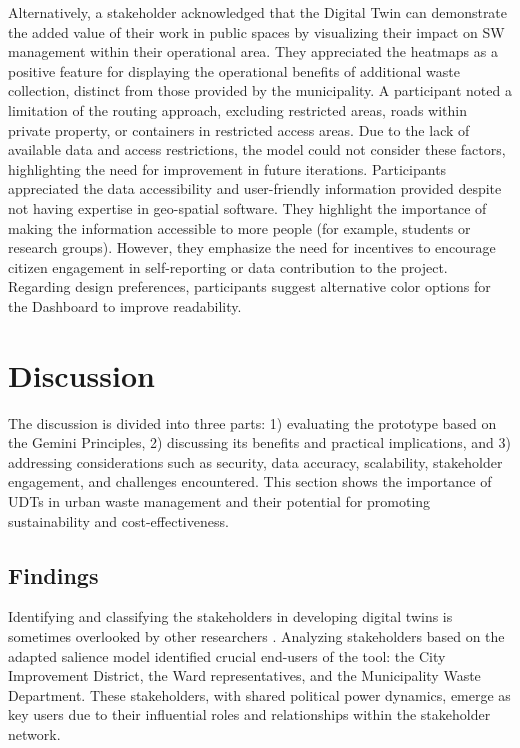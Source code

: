 \documentclass[authoryear,preprint,review,11pt,doubleblind]{elsarticle}
\begin{document}
    Alternatively, a stakeholder acknowledged that the Digital Twin can demonstrate the added value of their work in public spaces by visualizing their impact on SW management within their operational area. They appreciated the heatmaps as a positive feature for displaying the operational benefits of additional waste collection, distinct from those provided by the municipality. A participant noted a limitation of the routing approach, excluding restricted areas, roads within private property, or containers in restricted access areas. Due to the lack of available data and access restrictions, the model could not consider these factors, highlighting the need for improvement in future iterations. Participants appreciated the data accessibility and user-friendly information provided despite not having expertise in geo-spatial software. They highlight the importance of making the information accessible to more people (for example, students or research groups). However, they emphasize the need for incentives to encourage citizen engagement in self-reporting or data contribution to the project. Regarding design preferences, participants suggest alternative color options for the Dashboard to improve readability.

    \section{Discussion} \label{sec:Discussion}

    The discussion is divided into three parts: 1) evaluating the prototype based on the Gemini Principles, 2) discussing its benefits and practical implications, and 3) addressing considerations such as security, data accuracy, scalability, stakeholder engagement, and challenges encountered. This section shows the importance of UDTs in urban waste management and their potential for promoting sustainability and cost-effectiveness.

    
    \subsection{Findings}\label{subsec:Findings}
    Identifying and classifying the stakeholders in developing digital twins is sometimes overlooked by other researchers \citep{Bartos2021, Jiang2022, Xu2022, Yu2023}. Analyzing stakeholders based on the adapted salience model identified crucial end-users of the tool: the City Improvement District, the Ward representatives, and the Municipality Waste Department. These stakeholders, with shared political power dynamics, emerge as key users due to their influential roles and relationships within the stakeholder network.
\end{document}
